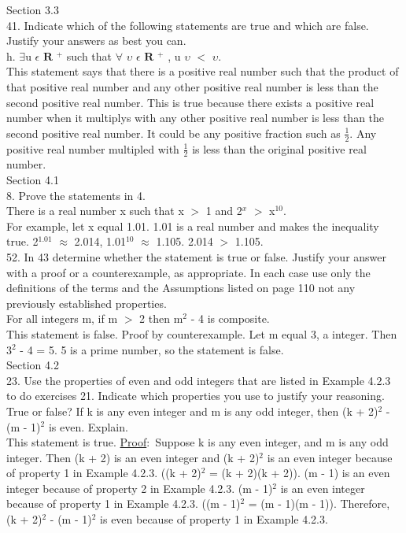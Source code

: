 \documentclass{article}
\begin{document}
Section 3.3\\
41. Indicate which of the following statements are true and which are false. Justify your answers as best you can. \\
h. $\exists$u $\epsilon$ $\mathbf{R}$ $^{+}$ such that $\forall$ $\upsilon$ $\epsilon$ $\mathbf{R}$ $^{+}$ , u $\upsilon$ $<$ $\upsilon$. \\
This statement says that there is a positive real number such that the product of that positive real number and any other positive real number is less than the second positive real number. This is true because there exists a positive real number when it multiplys with any other positive real number is less than the second positive
real number. It could be any positive fraction such as \( \frac{1}{2} \). Any positive real number multipled with \( \frac{1}{2} \) is less than the original positive real number. \\

Section 4.1\\
8. Prove the statements in 4. \\
There is a real number x such that x $>$ 1 and 2$^{x}$ $>$ x$^{10}$. \\
For example, let x equal 1.01. 1.01 is a real number and makes the inequality true. 2$^{1.01}$ $\approx$ 2.014, 1.01$^{10}$ $\approx$ 1.105. 2.014 $>$ 1.105. \\
52. In 43 determine whether the statement is true or false. Justify your answer with a proof or a counterexample, as appropriate.
In each case use only the definitions of the terms and the Assumptions listed on page 110 not any previously established properties. \\
For all integers m, if m $>$ 2 then m$^{2}$ - 4 is composite.\\
This statement is false. Proof by counterexample.
Let m equal 3, a integer. Then 3$^{2}$ - 4 = 5. 5 is a prime number, so the statement is false.\\

Section 4.2\\
23. Use the properties of even and odd integers that are listed in Example 4.2.3 to do exercises 21. Indicate which properties you use to justify your reasoning.\\
True or false? If k is any even integer and m is any odd integer, then (k + 2)$^{2}$ - (m - 1)$^{2}$ is even. Explain.\\
This statement is true. \underline{Proof}$\colon$ Suppose k is any even integer, and m is any odd integer. Then (k + 2) is an even integer and (k + 2)$^{2}$ is an even integer because of property 1 in Example 4.2.3. ((k + 2)$^{2}$ = (k + 2)(k + 2)). (m - 1) is an even integer because of property 2 in Example 4.2.3. (m - 1)$^{2}$ is an even integer because of property 1 in Example 4.2.3. ((m - 1)$^{2}$ = (m - 1)(m - 1)). Therefore, (k + 2)$^{2}$ - (m - 1)$^{2}$ is even because of property 1 in Example 4.2.3. \\
\end{document}
